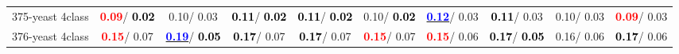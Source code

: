 \begin{table}[h]
\begin{center}
{\begin{tabular}{lc|c|c|c|c|c|c|c|c}
375-yeast 4class & \textcolor{red}{\textbf{  0.09}}/\textcolor{black}{\textbf{  0.02}} &   0.10/  0.03 & \textcolor{black}{\textbf{  0.11}}/\textcolor{black}{\textbf{  0.02}} & \textcolor{black}{\textbf{  0.11}}/\textcolor{black}{\textbf{  0.02}} &   0.10/\textcolor{black}{\textbf{  0.02}} & \underline{\textcolor{blue}{\textbf{  0.12}}}/  0.03 & \textcolor{black}{\textbf{  0.11}}/  0.03 &   0.10/  0.03 & \textcolor{red}{\textbf{  0.09}}/  0.03 \\
376-yeast 4class & \textcolor{red}{\textbf{  0.15}}/  0.07 & \underline{\textcolor{blue}{\textbf{  0.19}}}/\textcolor{black}{\textbf{  0.05}} & \textcolor{black}{\textbf{  0.17}}/  0.07 & \textcolor{black}{\textbf{  0.17}}/  0.07 & \textcolor{red}{\textbf{  0.15}}/  0.07 & \textcolor{red}{\textbf{  0.15}}/  0.06 & \textcolor{black}{\textbf{  0.17}}/\textcolor{black}{\textbf{  0.05}} &   0.16/  0.06 & \textcolor{black}{\textbf{  0.17}}/  0.06 \\\end{tabular}}\label{stratsALCKappa11AllRedux50a}
\end{center}
\end{table}
